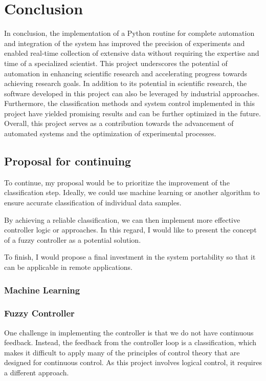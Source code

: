 \chapter{Conclusion}

In conclusion, the implementation of a Python routine for complete automation and integration of the system has improved the precision of experiments and enabled real-time collection of extensive data without requiring the expertise and time of a specialized scientist. 
This project underscores the potential of automation in enhancing scientific research and accelerating progress towards achieving research goals.
In addition to its potential in scientific research, the software developed in this project can also be leveraged by industrial approaches. 
Furthermore, the classification methods and system control implemented in this project have yielded promising results and can be further optimized in the future. Overall, this project serves as a contribution towards the advancement of automated systems and the optimization of experimental processes.

\section{Proposal for continuing}

To continue, my proposal would be to prioritize the improvement of the classification step. 
Ideally, we could use machine learning or another algorithm to ensure accurate classification of individual data samples.

By achieving a reliable classification, we can then implement more effective controller logic or approaches. 
In this regard, I would like to present the concept of a fuzzy controller as a potential solution.

To finish, I would propose a final investment in the system portability so that it can be applicable in remote applications.

\subsection{Machine Learning}

\subsection{Fuzzy Controller}

        One challenge in implementing the controller is that we do not have continuous feedback. 
        Instead, the feedback from the controller loop is a classification, which makes it difficult to apply many of the principles of control theory that are designed for continuous control. 
        As this project involves logical control, it requires a different approach. 
        
